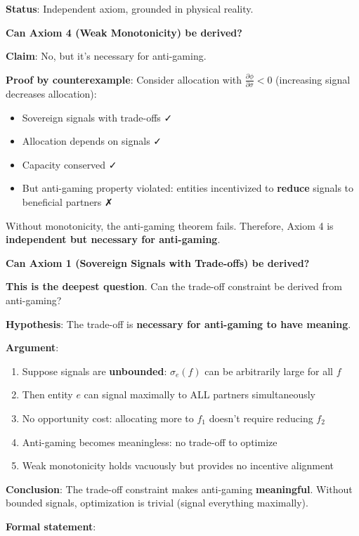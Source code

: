 \documentclass[11pt,a4paper]{article}
\theoremstyle{definition}
\theoremstyle{remark}
\begin{document}
\textbf{Status}: Independent axiom, grounded in physical reality.

\medskip

\textbf{Can Axiom 4 (Weak Monotonicity) be derived?}

\textbf{Claim}: No, but it's necessary for anti-gaming.

\textbf{Proof by counterexample}: Consider allocation with $\frac{\partial \phi}{\partial \sigma} < 0$ (increasing signal decreases allocation):
\begin{itemize}
\item Sovereign signals with trade-offs ✓
\item Allocation depends on signals ✓
\item Capacity conserved ✓
\item But anti-gaming property violated: entities incentivized to \textbf{reduce} signals to beneficial partners ✗
\end{itemize}

Without monotonicity, the anti-gaming theorem fails. Therefore, Axiom 4 is \textbf{independent but necessary for anti-gaming}.

\medskip

\textbf{Can Axiom 1 (Sovereign Signals with Trade-offs) be derived?}

\textbf{This is the deepest question}. Can the trade-off constraint be derived from anti-gaming?

\textbf{Hypothesis}: The trade-off is \textbf{necessary for anti-gaming to have meaning}.

\textbf{Argument}:
\begin{enumerate}
\item Suppose signals are \textbf{unbounded}: $\sigma_e(f)$ can be arbitrarily large for all $f$
\item Then entity $e$ can signal maximally to ALL partners simultaneously
\item No opportunity cost: allocating more to $f_1$ doesn't require reducing $f_2$
\item Anti-gaming becomes meaningless: no trade-off to optimize
\item Weak monotonicity holds vacuously but provides no incentive alignment
\end{enumerate}

\textbf{Conclusion}: The trade-off constraint makes anti-gaming \textbf{meaningful}. Without bounded signals, optimization is trivial (signal everything maximally).

\textbf{Formal statement}:
\end{document}
